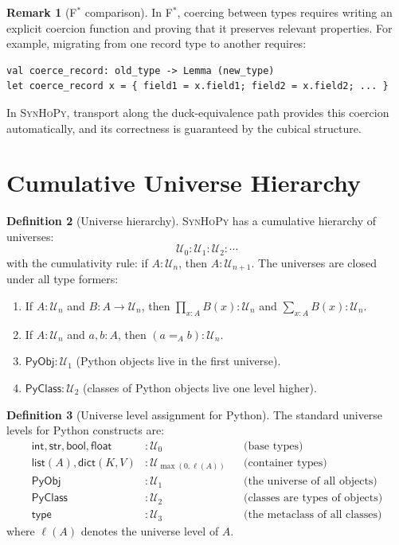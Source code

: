 \documentclass[11pt,a4paper]{report}
\theoremstyle{definition}
\newtheorem{definition}{Definition}[chapter]
\newtheorem{remark}[definition]{Remark}
\theoremstyle{plain}
\newcommand{\PyObj}{\mathsf{PyObj}}
\newcommand{\PyClass}{\mathsf{PyClass}}
\newcommand{\fstar}{F$^{*}$}
\newcommand{\synhopy}{\textsc{SynHoPy}}
\begin{document}
\begin{remark}[\fstar{} comparison]
In \fstar{}, coercing between types requires writing an explicit coercion function
and proving that it preserves relevant properties.  For example, migrating from
one record type to another requires:
\begin{lstlisting}[style=fstar]
val coerce_record: old_type -> Lemma (new_type)
let coerce_record x = { field1 = x.field1; field2 = x.field2; ... }
\end{lstlisting}
In \synhopy{}, transport along the duck-equivalence path provides this coercion
automatically, and its correctness is guaranteed by the cubical structure.
\end{remark}


\section{Cumulative Universe Hierarchy}

\begin{definition}[Universe hierarchy]
\label{def:universes}
\synhopy{} has a cumulative hierarchy of universes:
\[
  \mathcal{U}_0 : \mathcal{U}_1 : \mathcal{U}_2 : \cdots
\]
with the cumulativity rule: if $A : \mathcal{U}_n$, then $A : \mathcal{U}_{n+1}$.
The universes are closed under all type formers:
\begin{enumerate}
  \item If $A : \mathcal{U}_n$ and $B : A \to \mathcal{U}_n$, then
    $\prod_{x:A} B(x) : \mathcal{U}_n$ and $\sum_{x:A} B(x) : \mathcal{U}_n$.
  \item If $A : \mathcal{U}_n$ and $a, b : A$, then $(a =_A b) : \mathcal{U}_n$.
  \item $\PyObj : \mathcal{U}_1$ (Python objects live in the first universe).
  \item $\PyClass : \mathcal{U}_2$ (classes of Python objects live one level higher).
\end{enumerate}
\end{definition}

\begin{definition}[Universe level assignment for Python]
The standard universe levels for Python constructs are:
\begin{align}
  \mathsf{int}, \mathsf{str}, \mathsf{bool}, \mathsf{float} &: \mathcal{U}_0
    && \text{(base types)} \\
  \mathsf{list}(A), \mathsf{dict}(K, V) &: \mathcal{U}_{\max(0, \ell(A))}
    && \text{(container types)} \\
  \PyObj &: \mathcal{U}_1
    && \text{(the universe of all objects)} \\
  \PyClass &: \mathcal{U}_2
    && \text{(classes are types of objects)} \\
  \mathsf{type} &: \mathcal{U}_3
    && \text{(the metaclass of all classes)}
\end{align}
where $\ell(A)$ denotes the universe level of $A$.
\end{definition}
\end{document}
